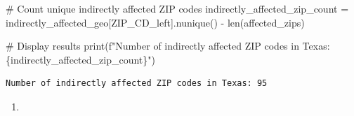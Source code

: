 \documentclass[
  letterpaper,
  DIV=11,
  numbers=noendperiod]{scrartcl}
\newenvironment{Shaded}{\begin{snugshade}}{\end{snugshade}}
\newcommand{\BuiltInTok}[1]{\textcolor[rgb]{0.00,0.23,0.31}{#1}}
\newcommand{\CommentTok}[1]{\textcolor[rgb]{0.37,0.37,0.37}{#1}}
\newcommand{\NormalTok}[1]{\textcolor[rgb]{0.00,0.23,0.31}{#1}}
\newcommand{\OperatorTok}[1]{\textcolor[rgb]{0.37,0.37,0.37}{#1}}
\newcommand{\SpecialCharTok}[1]{\textcolor[rgb]{0.37,0.37,0.37}{#1}}
\newcommand{\SpecialStringTok}[1]{\textcolor[rgb]{0.13,0.47,0.30}{#1}}
\newcommand{\StringTok}[1]{\textcolor[rgb]{0.13,0.47,0.30}{#1}}
\providecommand{\tightlist}{%
  \setlength{\itemsep}{0pt}\setlength{\parskip}{0pt}}\usepackage{longtable,booktabs,array}
\begin{document}
\begin{Shaded}
\begin{Highlighting}[]
\CommentTok{\# Count unique indirectly affected ZIP codes}
\NormalTok{indirectly\_affected\_zip\_count }\OperatorTok{=}\NormalTok{ indirectly\_affected\_geo[}\StringTok{\textquotesingle{}ZIP\_CD\_left\textquotesingle{}}\NormalTok{].nunique() }\OperatorTok{{-}} \BuiltInTok{len}\NormalTok{(affected\_zips)}

\CommentTok{\# Display results}
\BuiltInTok{print}\NormalTok{(}\SpecialStringTok{f"Number of indirectly affected ZIP codes in Texas: }\SpecialCharTok{\{}\NormalTok{indirectly\_affected\_zip\_count}\SpecialCharTok{\}}\SpecialStringTok{"}\NormalTok{)}
\end{Highlighting}
\end{Shaded}

\begin{verbatim}
Number of indirectly affected ZIP codes in Texas: 95
\end{verbatim}

\begin{enumerate}
\def\labelenumi{\arabic{enumi}.}
\setcounter{enumi}{3}
\tightlist
\item
\end{enumerate}
\end{document}
